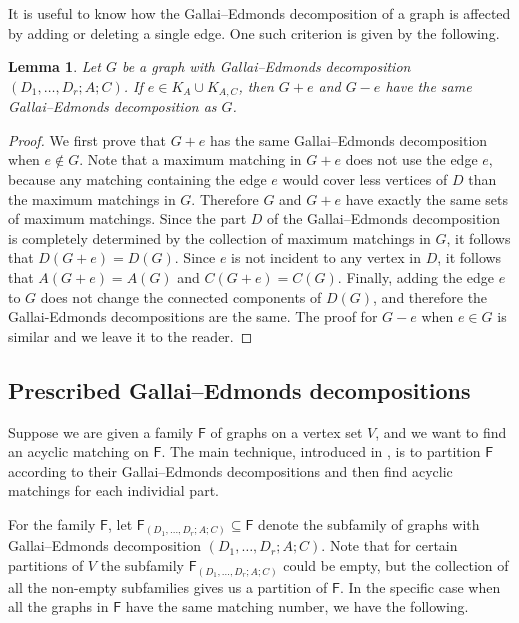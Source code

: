 \documentclass[10pt]{amsart}
\newtheorem{lemma}[thm]{Lemma}
\theoremstyle{definition}
\begin{document}
	
	
	It is useful to know how the Gallai--Edmonds decomposition of a graph is affected by adding or deleting a single edge. One such criterion is given by the following.
	
	\begin{lemma} \label{same-ge} Let $G$ be a graph with  Gallai--Edmonds decomposition $(D_1, \dots, D_r;A;C)$. If $e \in K_A \cup K_{A,C}$, then $G+e$ and $G-e$ have the same Gallai--Edmonds decomposition as $G$. 
	\end{lemma}
	
	\begin{proof} We first prove that $G+e$ has the same Gallai--Edmonds decomposition when $e \notin G$. Note that a maximum matching in $G+e$ does not use the edge $e$, because any matching containing the edge $e$ would cover less vertices of $D$ than the maximum matchings in $G$. Therefore $G$ and $G+e$ have exactly the same sets of maximum matchings. Since the part $D$ of the Gallai--Edmonds decomposition is completely determined by the collection of maximum matchings in $G$, it follows that $D(G+e) = D(G)$. Since $e$ is not incident to any vertex in $D$, it follows that $A(G+e) = A(G)$ and $C(G+e) = C(G)$. Finally, adding the edge $e$ to $G$ does not change the connected components of $D(G)$, and therefore the Gallai-Edmonds decompositions are the same. The proof for $G-e$ when $e\in G$ is similar and we leave it to the reader.  
	\end{proof}
	
	\subsection*{Prescribed Gallai--Edmonds decompositions} Suppose we are given a family $\mathsf{F}$ of graphs on a  vertex set $V$, and
	we want to find an acyclic matching on $\mathsf{F}$. The main technique, introduced in \cite{linusson_bounded_matching_complex},  is to partition $\mathsf{F}$ according to their Gallai--Edmonds decompositions and then find acyclic matchings for each individial part.
	
	\vspace{1ex}
	
	For the family $\mathsf{F}$, 
	let $\mathsf{F}_{(D_1, \dots, D_r; A; C)}\subseteq \mathsf{F}$ denote the subfamily of graphs with Gallai--Edmonds decomposition $(D_1, \dots, D_r; A; C)$. Note that for certain partitions of $V$ the subfamily $\mathsf{F}_{(D_1, \dots, D_r; A; C)}$ could be empty, but the collection of all the non-empty subfamilies gives us a partition of $\mathsf{F}$. In the specific case when all the graphs in $\mathsf{F}$ have the same matching number, we have the following.
	
\end{document}

